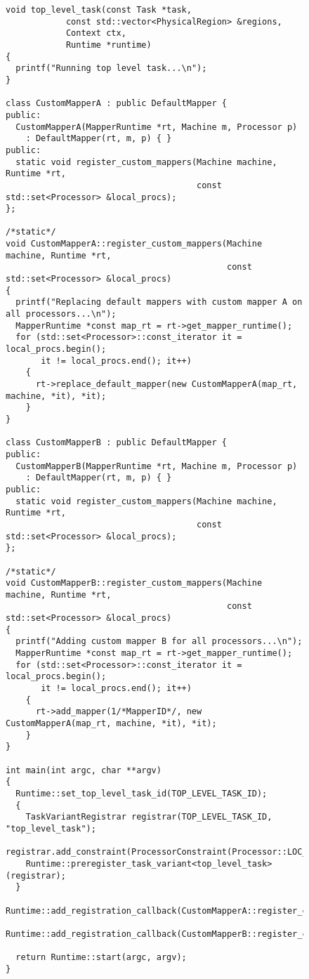 \begin{figure}
\begin{lstlisting}
void top_level_task(const Task *task,
		    const std::vector<PhysicalRegion> &regions,
		    Context ctx, 
		    Runtime *runtime)
{
  printf("Running top level task...\n");
}

class CustomMapperA : public DefaultMapper {
public:
  CustomMapperA(MapperRuntime *rt, Machine m, Processor p)
    : DefaultMapper(rt, m, p) { }
public:
  static void register_custom_mappers(Machine machine, Runtime *rt,
                                      const std::set<Processor> &local_procs);
};

/*static*/
void CustomMapperA::register_custom_mappers(Machine machine, Runtime *rt,
                                            const std::set<Processor> &local_procs)
{
  printf("Replacing default mappers with custom mapper A on all processors...\n");
  MapperRuntime *const map_rt = rt->get_mapper_runtime();
  for (std::set<Processor>::const_iterator it = local_procs.begin();
       it != local_procs.end(); it++)
    {
      rt->replace_default_mapper(new CustomMapperA(map_rt, machine, *it), *it);
    }
}

class CustomMapperB : public DefaultMapper {
public:
  CustomMapperB(MapperRuntime *rt, Machine m, Processor p)
    : DefaultMapper(rt, m, p) { }
public:
  static void register_custom_mappers(Machine machine, Runtime *rt,
                                      const std::set<Processor> &local_procs);
};

/*static*/
void CustomMapperB::register_custom_mappers(Machine machine, Runtime *rt,
                                            const std::set<Processor> &local_procs) 
{
  printf("Adding custom mapper B for all processors...\n");
  MapperRuntime *const map_rt = rt->get_mapper_runtime();
  for (std::set<Processor>::const_iterator it = local_procs.begin();
       it != local_procs.end(); it++)
    {
      rt->add_mapper(1/*MapperID*/, new CustomMapperA(map_rt, machine, *it), *it);
    }
}

int main(int argc, char **argv)
{
  Runtime::set_top_level_task_id(TOP_LEVEL_TASK_ID);
  {
    TaskVariantRegistrar registrar(TOP_LEVEL_TASK_ID, "top_level_task");
    registrar.add_constraint(ProcessorConstraint(Processor::LOC_PROC));
    Runtime::preregister_task_variant<top_level_task>(registrar);
  }
  Runtime::add_registration_callback(CustomMapperA::register_custom_mappers);
  Runtime::add_registration_callback(CustomMapperB::register_custom_mappers);

  return Runtime::start(argc, argv);
}
\end{lstlisting}
\caption{}
\label{fig:mapper_registration}
\end{figure}

